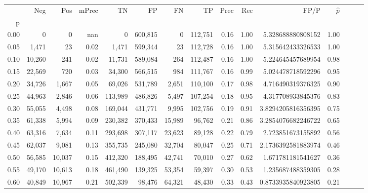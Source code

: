 \begin{tabular}{rrrrrrrrrrrrrrr}
\toprule
{} &     Neg &     Pos & mPrec &       TN &       FP &       FN &       TP &  Prec &   Rec &                   FP/P & $\hat{p}$ \\
p    &         &         &       &          &          &          &          &       &       &                        &           \\
\midrule
0.00 &       0 &       0 &   nan &        0 &  600,815 &        0 &  112,751 &  0.16 &  1.00 &      5.328688880808152 &      1.00 \\
0.05 &   1,471 &      23 &  0.02 &    1,471 &  599,344 &       23 &  112,728 &  0.16 &  1.00 &      5.315642433326533 &      1.00 \\
0.10 &  10,260 &     241 &  0.02 &   11,731 &  589,084 &      264 &  112,487 &  0.16 &  1.00 &      5.224645457689954 &      0.98 \\
0.15 &  22,569 &     720 &  0.03 &   34,300 &  566,515 &      984 &  111,767 &  0.16 &  0.99 &      5.024478718592296 &      0.95 \\
0.20 &  34,726 &   1,667 &  0.05 &   69,026 &  531,789 &    2,651 &  110,100 &  0.17 &  0.98 &      4.716490319376325 &      0.90 \\
0.25 &  44,963 &   2,846 &  0.06 &  113,989 &  486,826 &    5,497 &  107,254 &  0.18 &  0.95 &      4.317708933845376 &      0.83 \\
0.30 &  55,055 &   4,498 &  0.08 &  169,044 &  431,771 &    9,995 &  102,756 &  0.19 &  0.91 &     3.8294205816356395 &      0.75 \\
0.35 &  61,338 &   5,994 &  0.09 &  230,382 &  370,433 &   15,989 &   96,762 &  0.21 &  0.86 &     3.2854076682246722 &      0.65 \\
0.40 &  63,316 &   7,634 &  0.11 &  293,698 &  307,117 &   23,623 &   89,128 &  0.22 &  0.79 &      2.723851673155892 &      0.56 \\
0.45 &  62,037 &   9,081 &  0.13 &  355,735 &  245,080 &   32,704 &   80,047 &  0.25 &  0.71 &     2.1736392581883974 &      0.46 \\
0.50 &  56,585 &  10,037 &  0.15 &  412,320 &  188,495 &   42,741 &   70,010 &  0.27 &  0.62 &      1.671781181541627 &      0.36 \\
0.55 &  49,170 &  10,613 &  0.18 &  461,490 &  139,325 &   53,354 &   59,397 &  0.30 &  0.53 &      1.235687488359305 &      0.28 \\
0.60 &  40,849 &  10,967 &  0.21 &  502,339 &   98,476 &   64,321 &   48,430 &  0.33 &  0.43 &     0.8733935840923805 &      0.21 \\

\end{tabular}
